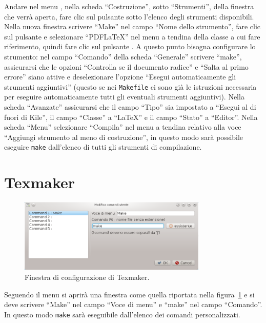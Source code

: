 Andare nel menu , nella scheda
``Costruzione'', sotto ``Strumenti'', della finestra che verrà aperta, fare clic
sul pulsante  sotto l'elenco degli strumenti disponibili.
Nella nuova finestra scrivere ``Make'' nel campo ``Nome dello strumento'', fare
clic sul pulsante  e selezionare ``PDFLaTeX'' nel menu a
tendina della classe a cui fare riferimento, quindi fare clic sul pulsante
.  A questo punto bisogna configurare lo strumento: nel campo
``Comando'' della scheda ``Generale'' scrivere ``make'', assicurarsi che le
opzioni ``Controlla se il documento radice'' e ``Salta al primo errore'' siano
attive e deselezionare l'opzione ``Esegui automaticamente gli strumenti
aggiuntivi'' (questo se nei \texttt{Makefile} ci sono già le istruzioni
necessaria per eseguire automaticamente tutti gli eventuali strumenti
aggiuntivi).  Nella scheda ``Avanzate'' assicurarsi che il campo ``Tipo'' sia
impostato a ``Esegui al di fuori di Kile'', il campo ``Classe'' a ``LaTeX'' e il
campo ``Stato'' a ``Editor''.  Nella scheda ``Menu'' selezionare ``Compila'' nel
menu a tendina relativo alla voce ``Aggiungi strumento al meno di costruzione'',
in questo modo sarà possibile eseguire \texttt{make} dall'elenco di tutti gli
strumenti di compilazione.

\section{Texmaker}
\label{sec:texmaker}

\begin{figure}
  \centering
  \includegraphics[width=0.8\textwidth]{figure/texmaker}
  \caption{Finestra di configurazione di Texmaker.}
  \label{fig:texmaker}
\end{figure}
Seguendo il menu
 si aprirà una
finestra come quella riportata nella figura~\ref{fig:texmaker} e si deve
scrivere ``Make'' nel campo ``Voce di menu'' e ``make'' nel campo ``Comando''.
In questo modo \texttt{make} sarà eseguibile dall'elenco dei comandi
personalizzati.


